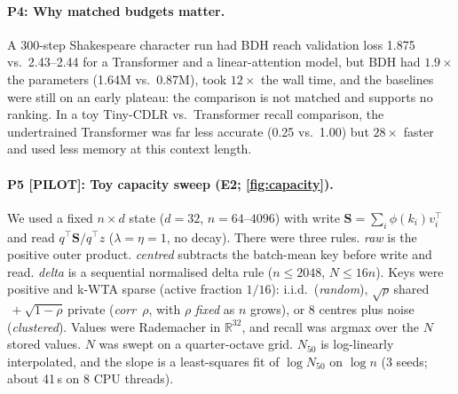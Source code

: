 \documentclass[10pt]{article}
\theoremstyle{remark}
\newcommand{\R}{\mathbb{R}}
\newcommand{\Sm}{\mathbf{S}}
\newcommand{\cdlr}{\textsc{CDLR}}
\begin{document}
\paragraph{P4: Why matched budgets matter.} A 300-step Shakespeare character run had BDH reach validation loss 1.875 vs.\
2.43--2.44 for a Transformer and a linear-attention model, but BDH had $1.9\times$ the parameters (1.64M vs.\ 0.87M),
took $12\times$ the wall time, and the baselines were still on an early plateau: the comparison is not matched and
supports no ranking. In a toy Tiny-\cdlr{} vs.\ Transformer recall comparison, the undertrained Transformer was far less
accurate (0.25 vs.\ 1.00) but $28\times$ faster and used less memory at this context length.

\paragraph{P5 [PILOT]: Toy capacity sweep (E2; \cref{fig:capacity}).} We used a fixed $n\times d$ state ($d=32$,
$n=64$--$4096$) with write $\Sm=\sum_i\phi(k_i)v_i^\top$ and read $q^\top\Sm/q^\top z$ ($\lambda=\eta=1$, no decay).
There were three rules. \emph{raw} is the positive outer product. \emph{centred} subtracts the batch-mean key
before write and read. \emph{delta} is a sequential normalised delta rule ($n\le2048$, $N\le16n$). Keys were
positive and k-WTA sparse (active fraction $1/16$): i.i.d.\ (\emph{random}), $\sqrt\rho\,$shared$\,+\sqrt{1-\rho}\,$private
(\emph{corr}~$\rho$, with $\rho$ \emph{fixed} as $n$ grows), or 8 centres plus noise (\emph{clustered}). Values were
Rademacher in $\R^{32}$, and recall was argmax over the $N$ stored values. $N$ was swept on a quarter-octave grid.
$N_{50}$ is log-linearly interpolated, and the slope is a least-squares fit of $\log N_{50}$ on $\log n$
(3 seeds; about 41\,s on 8 CPU threads).
\end{document}
